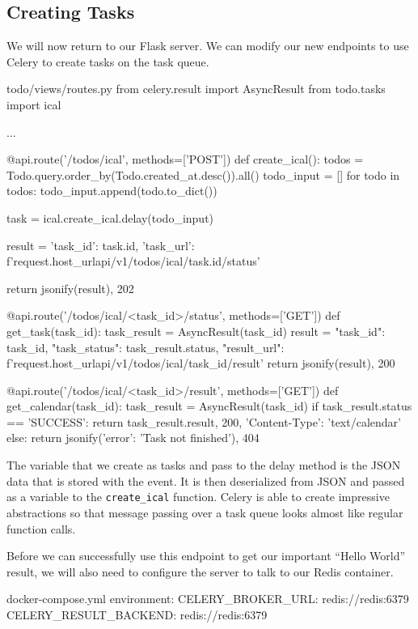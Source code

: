 \documentclass{csse4400}
\begin{document}
\subsection{Creating Tasks}

We will now return to our Flask server.
We can modify our new endpoints to use Celery to create tasks on the task queue.

\begin{code}[language=python,numbers=none]{todo/views/routes.py}
from celery.result import AsyncResult
from todo.tasks import ical

...

@api.route('/todos/ical', methods=['POST'])
def create_ical():
    todos = Todo.query.order_by(Todo.created_at.desc()).all()
    todo_input = []
    for todo in todos:
        todo_input.append(todo.to_dict())

    task = ical.create_ical.delay(todo_input)

    result = {
        'task_id': task.id,
        'task_url': f'{request.host_url}api/v1/todos/ical/{task.id}/status'
    }

    return jsonify(result), 202

@api.route('/todos/ical/<task_id>/status', methods=['GET'])
def get_task(task_id):
    task_result = AsyncResult(task_id)
    result = {
        "task_id": task_id,
        "task_status": task_result.status,
        "result_url": f'{request.host_url}api/v1/todos/ical/{task_id}/result'
    }
    return jsonify(result), 200

@api.route('/todos/ical/<task_id>/result', methods=['GET'])
def get_calendar(task_id):
    task_result = AsyncResult(task_id)
    if task_result.status == 'SUCCESS':
        return task_result.result, 200, {'Content-Type': 'text/calendar'}
    else:
        return jsonify({'error': 'Task not finished'}), 404
\end{code}

The variable that we create as tasks and pass to the delay method is the JSON data that is stored with the event.
It is then deserialized from JSON and passed as a variable to the \texttt{create\_ical} function.
Celery is able to create impressive abstractions so that message passing over a task queue looks almost like regular function calls.

Before we can successfully use this endpoint to get our important ``Hello World'' result,
we will also need to configure the server to talk to our Redis container.

\begin{code}[numbers=none]{docker-compose.yml}
  environment:
    CELERY_BROKER_URL: redis://redis:6379
    CELERY_RESULT_BACKEND: redis://redis:6379
\end{code}
\end{document}
